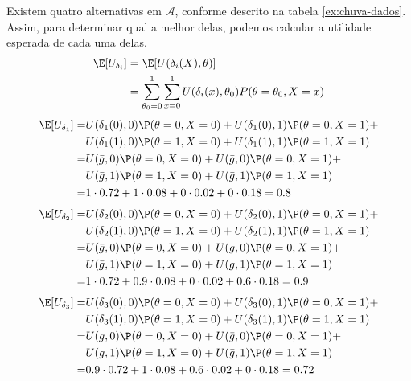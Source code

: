 \begin{example}
 \label{ex:guarda-chuva-dados-2}
 Existem quatro alternativas em $\mathcal{A}$,
 conforme descrito na tabela \ref{ex:chuva-dados}.
 Assim, para determinar qual a melhor delas,
 podemos calcular a utilidade esperada de cada uma delas.
 \begin{align*}
  \E[U_{\delta_{i}}]
  &= \E[U(\delta_{i}(X),\theta)] \\
  &= \sum_{\theta_{0}=0}^{1}{\sum_{x=0}^{1}{U(\delta_{i}(x),\theta_{0})P(\theta=\theta_{0},X=x)}} \\
 \end{align*}
 \begin{align*}
  \E[U_{\delta_{1}}]
  =& U(\delta_{1}(0),0)\P(\theta=0,X=0)
  +U(\delta_{1}(0),1)\P(\theta=0,X=1) +	\\
  & U(\delta_{1}(1),0)\P(\theta=1,X=0)
  + U(\delta_{1}(1),1)\P(\theta=1,X=1) \\
  =& U(\bar{g},0)\P(\theta=0,X=0)+ 
  U(\bar{g},0)\P(\theta=0,X=1) + \\
  & U(\bar{g},1)\P(\theta=1,X=0) +
  U(\bar{g},1)\P(\theta=1,X=1) \\
  =& 1 \cdot 0.72 + 1 \cdot 0.08
  + 0 \cdot 0.02 + 0 \cdot 0.18 = 0.8
 \end{align*}
 \begin{align*}
  \E[U_{\delta_{2}}]
  =& U(\delta_{2}(0),0)\P(\theta=0,X=0)
  + U(\delta_{2}(0),1)\P(\theta=0,X=1) + \\
  & U(\delta_{2}(1),0)\P(\theta=1,X=0) +
  U(\delta_{2}(1),1)\P(\theta=1,X=1) \\
  =& U(\bar{g},0)\P(\theta=0,X=0)
  + U(g,0)\P(\theta=0,X=1) + \\
  & U(\bar{g},1)\P(\theta=1,X=0) +
  U(g,1)\P(\theta=1,X=1) \\
  =& 1 \cdot 0.72 + 0.9 \cdot 0.08
  + 0 \cdot 0.02 + 0.6 \cdot 0.18 = 0.9
 \end{align*}
 \begin{align*}
  \E[U_{\delta_{3}}]
  =& U(\delta_{3}(0),0)\P(\theta=0,X=0)
  + U(\delta_{3}(0),1)\P(\theta=0,X=1) + \\
  & U(\delta_{3}(1),0)\P(\theta=1,X=0) +
  U(\delta_{3}(1),1)\P(\theta=1,X=1) \\
  =& U(g,0)\P(\theta=0,X=0) +
  U(\bar{g},0)\P(\theta=0,X=1) + \\
  & U(g,1)\P(\theta=1,X=0) +
  U(\bar{g},1)\P(\theta=1,X=1) \\
  =& 0.9 \cdot 0.72 + 1 \cdot 0.08
  + 0.6 \cdot 0.02 + 0 \cdot 0.18 = 0.72

\end{align*}
\end{example}
